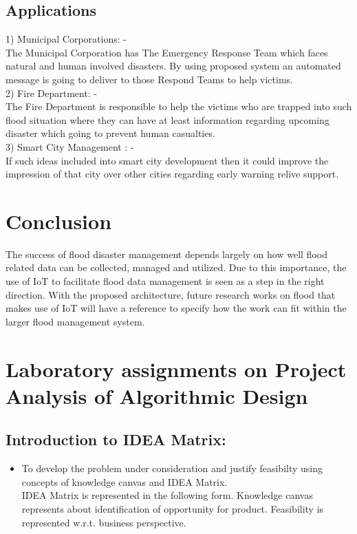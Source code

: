 \documentclass[a4paper,12pt]{report}
\begin{document}
\begin{itemize}
\section{Applications}
1)	Municipal Corporations: - \\
The Municipal Corporation has The Emergency Response Team which faces natural and human involved disasters. By using proposed system an automated message is going to deliver to those Respond Teams to help victims.\\
2)	Fire Department: -\\
The Fire Department is responsible to help the victims who are trapped into such flood situation where they can have at least information regarding upcoming disaster which going to prevent human casualties. \\
3)	Smart City Management : -\\
If such ideas included into smart city development then it could improve the impression of that city over other cities regarding early warning relive support.


\chapter {Conclusion }
The success of flood disaster management depends largely on how well flood related data can be collected, managed and utilized. Due to this importance, the use of IoT to facilitate flood data management is seen as a step in the right direction. With the proposed architecture, future research works on flood that makes use of IoT will have a reference to specify how the work can fit within the larger flood management system.  \newline



\appendix 
{}


\chapter{Laboratory assignments on Project Analysis of Algorithmic Design}
\section{Introduction to IDEA Matrix:}
\begin{itemize}
\item To develop the problem under consideration and justify feasibilty using
concepts of knowledge canvas and IDEA Matrix.\\
 IDEA Matrix is represented in the following form. Knowledge canvas represents about identification  of opportunity for product. Feasibility is represented w.r.t. business perspective.\\ 


\end{itemize}
\end{itemize}
\end{document}
